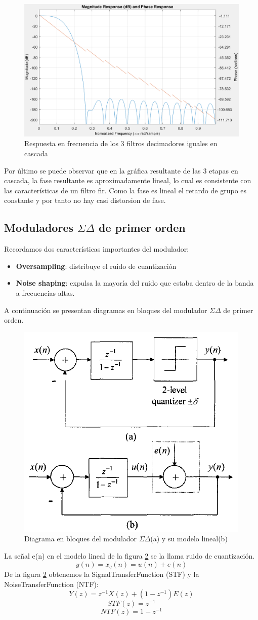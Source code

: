 \documentclass[assd_tp3_main.tex]{subfiles}
\begin{document}
\begin{figure}[H]
\centering
\includegraphics[width=0.8\linewidth]{images/ej4/Decimation_3filt_cascade.png}
\caption{Respuesta en frecuencia de los 3 filtros decimadores iguales en cascada}
\label{fig:Decimation_3filt_cascade}
\end{figure}
Por último se puede observar que en la gráfica resultante de las 3 etapas en cascada, la fase resultante es aproximadamente lineal, lo cual es consistente con las características de un filtro fir. Como la fase es lineal el retardo de grupo es constante y por tanto no hay casi distorsion de fase.

\subsection{Moduladores $\Sigma\Delta$ de primer orden }
Recordamos dos características importantes del modulador:
\begin{itemize}
\item \textbf{Oversampling}: distribuye el ruido de cuantización 
\item \textbf{Noise shaping}: expulsa la mayoría del ruido que estaba dentro de la banda a frecuencias altas. 
\end{itemize}
A continuación se presentan diagramas en bloques del modulador $\Sigma\Delta$ de primer orden.
\begin{figure}[H]
\centering
\includegraphics[width=0.4\linewidth]{images/ej4/sd_linmodel.png}
\caption{Diagrama en bloques del modulador $\Sigma\Delta$(a) y su modelo lineal(b)}
\label{fig:sigmadelmod_model}
\end{figure}
La señal e(n) en el modelo lineal de la figura \ref{fig:sigmadelmod_model} se la llama ruido de cuantización.
\[ y(n)=x_q(n)= u(n)+e(n) \]
De la figura \ref{fig:sigmadelmod_model} obtenemos la SignalTransferFunction (STF) y la NoiseTransferFunction (NTF):
\[ Y(z)= z^{-1}X(z)+(1-z^{-1})E(z) \]
\[ STF(z)= z^{-1} \]
\[ NTF(z)= 1-z^{-1} \]
\end{document}
